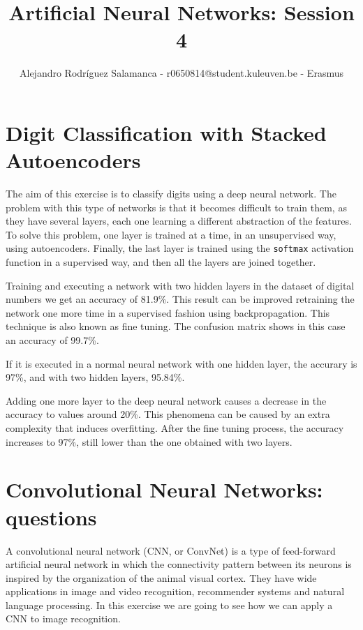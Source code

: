 \documentclass[10pt]{article}
\author{Alejandro Rodríguez Salamanca - r0650814@student.kuleuven.be - Erasmus}
\date{}
\title{Artificial Neural Networks: Session 4}
\begin{document}
\maketitle
\begin{multicols}{2}

 
  
  \section*{Digit Classification with Stacked Autoencoders}
  The aim of this exercise is to classify digits using a deep neural network. The problem
  with this type of networks is that it becomes difficult to train them, as they have
  several layers, each one learning a different abstraction of the features. To solve this
  problem, one layer is trained at a time, in an unsupervised way, using autoencoders. Finally,
  the last layer is trained using the \texttt{softmax} activation function in a supervised way,
  and then all the layers are joined together.

  Training and executing a network with two hidden layers in the dataset of digital numbers we get
  an accuracy of 81.9\%. This result can be improved retraining the network one more time in
  a supervised fashion using backpropagation. This technique is also known as fine tuning.
  The confusion matrix shows in this case an accuracy of 99.7\%.

  If it is executed in a normal neural network with one hidden layer, the accurary is 97\%,
  and with two hidden layers, 95.84\%.

  Adding one more layer to the deep neural network causes a decrease in the accuracy to values
  around 20\%. This phenomena can be caused by an extra complexity that induces overfitting.
  After the fine tuning process, the accuracy increases to 97\%, still lower than the one
  obtained with two layers.

  

  \section*{Convolutional Neural Networks: questions}
  A convolutional neural network (CNN, or ConvNet) is a type of feed-forward artificial
  neural network in which the connectivity pattern between its neurons is inspired by
  the organization of the animal visual cortex. They have wide applications in image and
  video recognition, recommender systems and natural language processing.
  In this exercise we are going to see how we can apply a CNN to image recognition.


\end{multicols}
\end{document}
